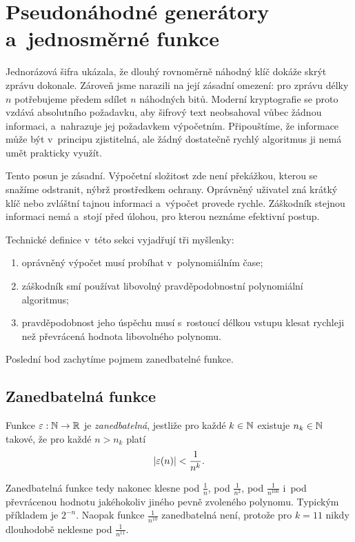 \section{Pseudonáhodné generátory a~jednosměrné funkce}\label{sec:krypto-prg-owf}

Jednorázová šifra ukázala, že dlouhý rovnoměrně náhodný klíč dokáže skrýt zprávu dokonale. Zároveň jsme narazili na její zásadní omezení: pro zprávu délky $n$ potřebujeme předem sdílet $n$ náhodných bitů. Moderní kryptografie se proto vzdává absolutního požadavku, aby šifrový text neobsahoval vůbec žádnou informaci, a~nahrazuje jej požadavkem výpočetním. Připouštíme, že informace může být v~principu zjistitelná, ale žádný dostatečně rychlý algoritmus ji nemá umět prakticky využít.

Tento posun je zásadní. Výpočetní složitost zde není překážkou, kterou se snažíme odstranit, nýbrž prostředkem ochrany. Oprávněný uživatel zná krátký klíč nebo zvláštní tajnou informaci a~výpočet provede rychle. Záškodník stejnou informaci nemá a~stojí před úlohou, pro kterou neznáme efektivní postup.

Technické definice v~této sekci vyjadřují tři myšlenky:
\begin{enumerate}
    \item oprávněný výpočet musí probíhat v~polynomiálním čase;
    \item záškodník smí používat libovolný pravděpodobnostní polynomiální algoritmus;
    \item pravděpodobnost jeho úspěchu musí s~rostoucí délkou vstupu klesat rychleji než převrácená hodnota libovolného polynomu.
\end{enumerate}
Poslední bod zachytíme pojmem zanedbatelné funkce.

\subsection{Zanedbatelná funkce}

\begin{definition}\label{def:krypto-zanedbatelna}
    Funkce $\varepsilon:\mathbb{N} \rightarrow \mathbb{R}$ je \emph{zanedbatelná}, jestliže pro každé $k\in\mathbb{N}$ existuje $n_k\in\mathbb{N}$ takové, že pro každé $n>n_k$ platí
    \[
        \left| \varepsilon(n) \right|<\frac{1}{n^k}.
    \]
\end{definition}

Zanedbatelná funkce tedy nakonec klesne pod $\frac{1}{n}$, pod $\frac{1}{n^2}$, pod $\frac{1}{n^{100}}$ i~pod převrácenou hodnotu jakéhokoliv jiného pevně zvoleného polynomu. Typickým příkladem je $2^{-n}$. Naopak funkce $\frac{1}{n^{10}}$ zanedbatelná není, protože pro $k=11$ nikdy dlouhodobě neklesne pod $\frac{1}{n^{11}}$.

